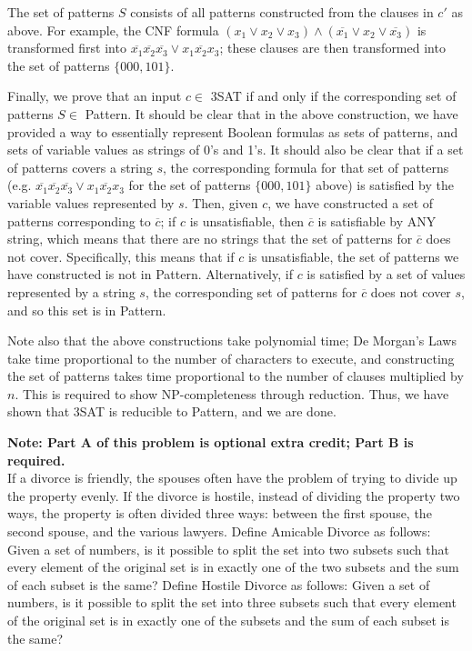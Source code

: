 \documentclass[solution, letterpaper]{cs121}
\begin{document}
\begin{solution}
The set of patterns $S$ consists of all patterns constructed from the clauses in $c'$ as above.  For example, the CNF formula $(x_1 \vee x_2 \vee x_3) \wedge (\overline{x_1} \vee x_2 \vee \overline{x_3})$ is transformed first into $\overline{x_1}\overline{x_2}\overline{x_3} \vee x_1\overline{x_2}x_3$; these clauses are then transformed into the set of patterns $\{000, 101\}$.

Finally, we prove that an input $c \in$ {\sc 3SAT} if and only if the corresponding set of patterns $S \in$ {\sc Pattern}. It should be clear that in the above construction, we have provided a way to essentially represent Boolean formulas as sets of patterns, and sets of variable values as strings of 0's and 1's.  It should also be clear that if a set of patterns covers a string $s$, the corresponding formula for that set of patterns (e.g. $\overline{x_1}\overline{x_2}\overline{x_3} \vee x_1\overline{x_2}x_3$ for the set of patterns $\{000, 101\}$ above) is satisfied by the variable values represented by $s$.  Then, given $c$, we have constructed a set of patterns corresponding to $\overline{c}$; if $c$ is unsatisfiable, then $\overline{c}$ is satisfiable by ANY string, which means that there are no strings that the set of patterns for $\overline{c}$ does not cover.  Specifically, this means that if $c$ is unsatisfiable, the set of patterns we have constructed is not in {\sc Pattern}.  Alternatively, if $c$ is satisfied by a set of values represented by a string $s$, the corresponding set of patterns for $\overline{c}$ does not cover $s$, and so this set is in {\sc Pattern}.  

Note also that the above constructions take polynomial time; De Morgan's Laws take time proportional to the number of characters to execute, and constructing the set of patterns takes time proportional to the number of clauses multiplied by $n$.  This is required to show NP-completeness through reduction.  Thus, we have shown that {\sc 3SAT} is reducible to {\sc Pattern}, and we are done.
\end{solution}

\textbf{Note: Part A of this problem is optional extra credit; Part B is required.}\\
If a divorce is friendly, the spouses often have the problem of trying to divide up the property evenly. If the divorce is hostile, instead of dividing the property two ways, the property is often divided three ways: between the first spouse, the second spouse, and the various lawyers. Define {\sc Amicable Divorce} as follows: Given a set of numbers, is it possible to split the set into two subsets such that every element of the original set is in exactly one of the two subsets and the sum of each subset is the same?
Define {\sc Hostile Divorce} as follows: Given a set of numbers, is it possible to split the set into three subsets such that every element of the original set is in exactly one of the subsets and the sum of each subset is the same? 
\end{document}
